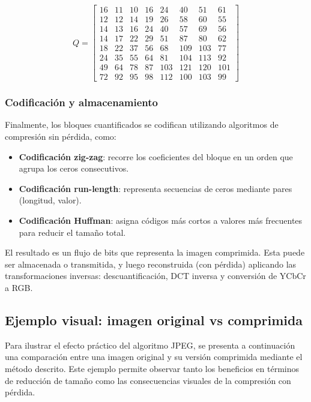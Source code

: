 \documentclass[8pt,a4paper]{article}
\theoremstyle{definition}
\theoremstyle{remark}
\begin{document}
\begin{multicols}{2}
            \[
            Q =
            \begin{bmatrix}
            16&11&10&16&24&40&51&61\\
            12&12&14&19&26&58&60&55\\
            14&13&16&24&40&57&69&56\\
            14&17&22&29&51&87&80&62\\
            18&22&37&56&68&109&103&77\\
            24&35&55&64&81&104&113&92\\
            49&64&78&87&103&121&120&101\\
            72&92&95&98&112&100&103&99
            \end{bmatrix}
            \]
            
            \subsubsection{Codificación y almacenamiento}
            Finalmente, los bloques cuantificados se codifican utilizando algoritmos de compresión sin pérdida, como:
            \begin{itemize}[noitemsep, topsep=0pt, left=10pt]
                \item \textbf{Codificación zig-zag}: recorre los coeficientes del bloque en un orden que agrupa los ceros consecutivos.
                \item \textbf{Codificación run-length}: representa secuencias de ceros mediante pares (longitud, valor).
                \item \textbf{Codificación Huffman}: asigna códigos más cortos a valores más frecuentes para reducir el tamaño total.
            \end{itemize}
            El resultado es un flujo de bits que representa la imagen comprimida. Esta puede ser almacenada o transmitida, y luego reconstruida (con pérdida) aplicando las transformaciones inversas: descuantificación, DCT inversa y conversión de YCbCr a RGB.
            \subsection{Ejemplo visual: imagen original vs comprimida}
            Para ilustrar el efecto práctico del algoritmo JPEG, se presenta a continuación una comparación entre una imagen original y su versión comprimida mediante el método descrito. Este ejemplo permite observar tanto los beneficios en términos de reducción de tamaño como las consecuencias visuales de la compresión con pérdida.


\end{multicols}
\end{document}
